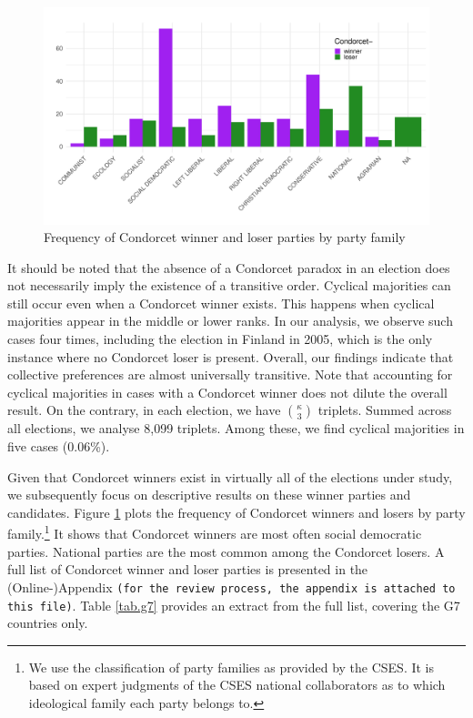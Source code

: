 \documentclass[12pt]{scrartcl}
\begin{document}
\begin{figure}
	\centering
	\caption{Frequency of Condorcet winner and loser parties by party family \label{f1}}
\includegraphics[width=\linewidth]{barplotraw}
\end{figure}

It should be noted that the absence of a Condorcet paradox in an election does not necessarily imply the existence of a transitive order. Cyclical majorities can still occur even when a Condorcet winner exists. This happens when cyclical majorities appear in the middle or lower ranks. In our analysis, we observe such cases four times, including the election in Finland in 2005, which is the only instance where no Condorcet loser is present. Overall, our findings indicate that collective preferences are almost universally transitive. Note that accounting for cyclical majorities in cases with a Condorcet winner does not dilute the overall result. On the contrary, in each election, we have $\binom{\kappa}{3}$ triplets. Summed across all elections, we analyse 8,099 triplets. Among these, we find cyclical majorities in five cases (0.06\%).

Given that Condorcet winners exist in virtually all of the elections under study, we subsequently focus on descriptive results on these winner parties and candidates. Figure \ref{f1} plots the frequency of Condorcet winners and losers by party family.\footnote{
    We use the classification of party families as provided by the CSES. It is based on expert judgments of the CSES national collaborators as to which ideological family each party belongs to. 
} It shows that Condorcet winners are most often social democratic parties. National parties are the most common among the Condorcet losers. A full list of Condorcet winner and loser parties is presented in the (Online-)Appendix \texttt{(for the review process, the appendix is attached to this file)}. Table \ref{tab.g7} provides an extract from the full list, covering the G7 countries only.
\end{document}
